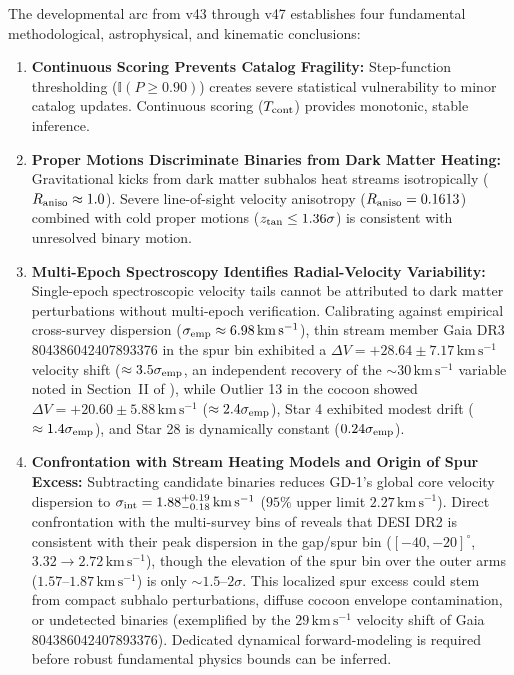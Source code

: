 \documentclass[twocolumn]{aastex631}
\begin{document}
The developmental arc from v43 through v47 establishes four fundamental methodological, astrophysical, and kinematic conclusions:
\begin{enumerate}
\item \textbf{Continuous Scoring Prevents Catalog Fragility:} Step-function thresholding ($\mathbb{I}(P \ge 0.90)$) creates severe statistical vulnerability to minor catalog updates. Continuous scoring ($T_{\rm cont}$) provides monotonic, stable inference.
\item \textbf{Proper Motions Discriminate Binaries from Dark Matter Heating:} Gravitational kicks from dark matter subhalos heat streams isotropically ($R_{\rm aniso} \approx 1.0$). Severe line-of-sight velocity anisotropy ($R_{\rm aniso} = 0.1613$) combined with cold proper motions ($z_{\rm tan} \le 1.36\sigma$) is consistent with unresolved binary motion.
\item \textbf{Multi-Epoch Spectroscopy Identifies Radial-Velocity Variability:} Single-epoch spectroscopic velocity tails cannot be attributed to dark matter perturbations without multi-epoch verification. Calibrating against empirical cross-survey dispersion ($\sigma_{\rm emp} \approx 6.98\,\mathrm{km\,s^{-1}}$), thin stream member Gaia DR3 804386042407893376 in the spur bin exhibited a $\Delta V = +28.64 \pm 7.17\,\mathrm{km\,s^{-1}}$ velocity shift ($\approx 3.5\sigma_{\rm emp}$, an independent recovery of the $\sim 30\,\mathrm{km\,s^{-1}}$ variable noted in Section~II of \citealt{Nibauer2026}), while Outlier 13 in the cocoon showed $\Delta V = +20.60 \pm 5.88\,\mathrm{km\,s^{-1}}$ ($\approx 2.4\sigma_{\rm emp}$), Star 4 exhibited modest drift ($\approx 1.4\sigma_{\rm emp}$), and Star 28 is dynamically constant ($0.24\sigma_{\rm emp}$).
\item \textbf{Confrontation with Stream Heating Models and Origin of Spur Excess:} Subtracting candidate binaries reduces GD-1's global core velocity dispersion to $\sigma_{\rm int} = 1.88_{-0.18}^{+0.19}\,\mathrm{km\,s^{-1}}$ ($95\%$ upper limit $2.27\,\mathrm{km\,s^{-1}}$). Direct confrontation with the multi-survey bins of \citet{Nibauer2026} reveals that DESI DR2 is consistent with their peak dispersion in the gap/spur bin ($[-40, -20]^\circ$, $3.32 \to 2.72\,\mathrm{km\,s^{-1}}$), though the elevation of the spur bin over the outer arms ($1.57\text{--}1.87\,\mathrm{km\,s^{-1}}$) is only $\sim 1.5\text{--}2\sigma$. This localized spur excess could stem from compact subhalo perturbations, diffuse cocoon envelope contamination, or undetected binaries (exemplified by the $29\,\mathrm{km\,s^{-1}}$ velocity shift of Gaia 804386042407893376). Dedicated dynamical forward-modeling is required before robust fundamental physics bounds can be inferred.
\end{enumerate}
\end{document}
